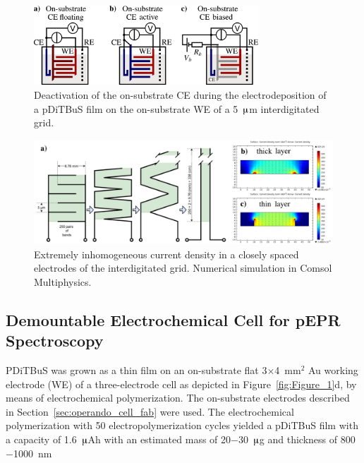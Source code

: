 \begin{figure}[h]
\center
	\includegraphics[width=0.75\textwidth]{./operando_epr/figures/solid/separate_deposition.pdf}
	\caption{Deactivation of the on-substrate CE during the electrodeposition of a pDiTBuS film on the on-substrate WE of a 5~$\muup$m interdigitated grid.}
	\label{fig:transistor_battery_deposition}
\end{figure}

\begin{figure}[h]
\center
	\includegraphics[width=1\textwidth]{./operando_epr/figures/solid/current_density.pdf}
	\caption{Extremely inhomogeneous current density in a closely spaced electrodes of the interdigitated grid. Numerical simulation in Comsol Multiphysics.}
	\label{fig:grid_current_density_sumulation}
\end{figure}



\subsection{Demountable Electrochemical Cell for pEPR Spectroscopy}
\label{fab:ex_situ_charging}



PDiTBuS was grown as a thin film on an on-substrate flat 3$\times$4~mm$^2$ Au working electrode (WE) of a three-electrode cell as depicted in Figure~\ref{fig:Figure_1}d, by means of electrochemical polymerization. The on-substrate electrodes described in Section~\ref{sec:operando_cell_fab} were used. The electrochemical polymerization with 50 electropolymerization cycles yielded a pDiTBuS film with a capacity of 1.6~$\muup$Ah with an estimated mass of 20$-$30~$\muup$g and thickness of 800$-$1000~nm \\

